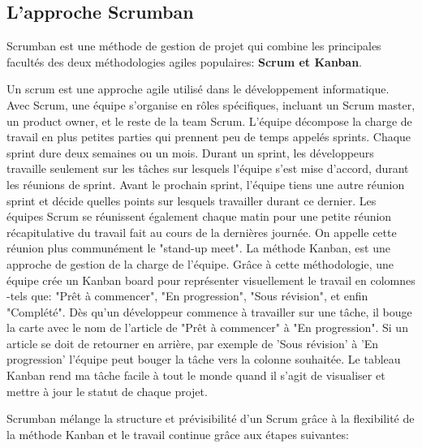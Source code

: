 \documentclass[../main.tex]{subfiles}
\begin{document}
    \subsection{L'approche Scrumban}
    Scrumban est une méthode de gestion de projet qui combine les principales facultés des deux méthodologies agiles populaires: \textbf{Scrum et Kanban}.\cite{scrumban}
    \begin{outline}
     \1 Un scrum est une approche agile utilisé dans le développement informatique.\cite{scrumban_basics} 
       \2 Avec Scrum, une équipe s'organise en rôles spécifiques, incluant un Scrum master, un product owner, et le reste de la team Scrum. 
       \2 L'équipe décompose la charge de travail en plus petites parties qui prennent peu de temps appelés sprints. Chaque sprint dure deux semaines ou un mois.
       \2 Durant un sprint, les développeurs travaille seulement sur les tâches sur lesquels l'équipe s'est mise d'accord, durant les réunions de sprint.
       \2 Avant le prochain sprint, l'équipe tiens une autre réunion sprint et décide quelles points sur lesquels travailler durant ce dernier. Les équipes Scrum se réunissent également chaque matin pour une petite réunion récapitulative du travail fait au cours de la dernières journée. On appelle cette réunion plus communément le "stand-up meet".
     \1 La méthode Kanban, est une approche de gestion de la charge de l'équipe.\cite{scrumban_basics} 
        \2 Grâce à cette méthodologie, une équipe crée un Kanban board pour représenter visuellement le travail en colomnes -tels que: "Prêt à commencer", "En progression", "Sous révision", et enfin "Complété".
        \2 Dès qu'un développeur commence à travailler sur une tâche, il bouge la carte avec le nom de l'article de "Prêt à commencer" à "En progression".
        \2 Si un article se doit de retourner en arrière, par exemple de 'Sous révision' à 'En progression' l'équipe peut bouger la tâche vers la colonne souhaitée.  
        \2 Le tableau Kanban rend ma tâche facile à tout le monde quand il s'agit de visualiser et mettre à jour le statut de chaque projet. 
    \end{outline}
    Scrumban mélange la structure et prévisibilité d'un Scrum grâce à la flexibilité de la méthode Kanban et le travail continue grâce aux étapes suivantes:\cite{scrumban_basics}
\end{document}
